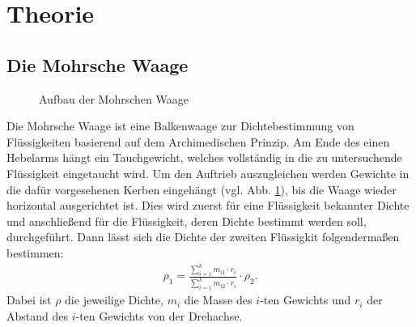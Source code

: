 \section{Theorie}
\subsection{Die Mohrsche Waage}
%
\begin{figure}[!htbp]
\centering
\resizebox{0.5\textwidth}{!}{}
\caption{Aufbau der Mohrschen Waage \cite{LP:Online}}
\label{img:mohrsche}
\end{figure}
%
Die Mohrsche Waage ist eine Balkenwaage zur Dichtebestimmung von Flüssigkeiten basierend auf dem Archimedischen Prinzip. Am Ende des einen Hebelarms hängt ein Tauchgewicht, welches vollständig in die zu untersuchende Flüssigkeit eingetaucht wird. Um den Auftrieb auszugleichen werden Gewichte in die dafür vorgesehenen Kerben eingehängt (vgl. Abb. \ref{img:mohrsche}), bis die Waage wieder horizontal ausgerichtet ist. Dies wird zuerst für eine Flüssigkeit bekannter Dichte und anschließend für die Flüssigkeit, deren Dichte bestimmt werden soll, durchgeführt. Dann lässt sich die Dichte der zweiten Flüssigkit folgendermaßen bestimmen:\cite{LP:Online}
%
\begin{align}
	\rho_1=\frac{\sum_{i=1}^{k}m_{i1} \cdot r_i}{\sum_{i=1}^{k}m_{i2} \cdot r_i}\cdot\rho_2.
	\label{eq:mohrsche}
\end{align}
%
Dabei ist $\rho$ die jeweilige Dichte, $m_i$ die Masse des $i$-ten Gewichts und $r_i$ der Abstand des $i$-ten Gewichts von  der Drehachse.